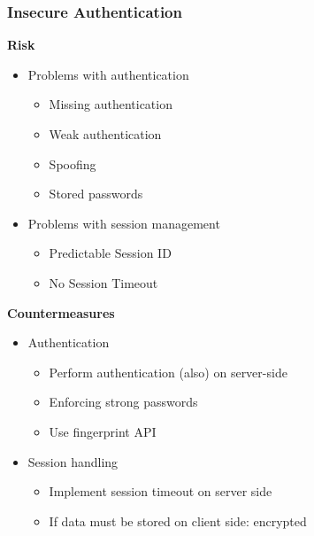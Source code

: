 \subsubsection{Insecure Authentication}
\textbf{Risk}
\begin{itemize}
    \item Problems with authentication
    \begin{itemize}
        \item Missing authentication
        \item Weak authentication
        \item Spoofing
        \item Stored passwords
    \end{itemize}
    \item Problems with session management
    \begin{itemize}
        \item Predictable Session ID
        \item No Session Timeout
    \end{itemize}
\end{itemize}
\textbf{Countermeasures}
\begin{itemize}
    \item Authentication
    \begin{itemize}
        \item Perform authentication (also) on server-side
        \item Enforcing strong passwords
        \item Use fingerprint API
    \end{itemize}
    \item Session handling
    \begin{itemize}
        \item Implement session timeout on server side
        \item If data must be stored on client side: encrypted
    \end{itemize}
\end{itemize}

